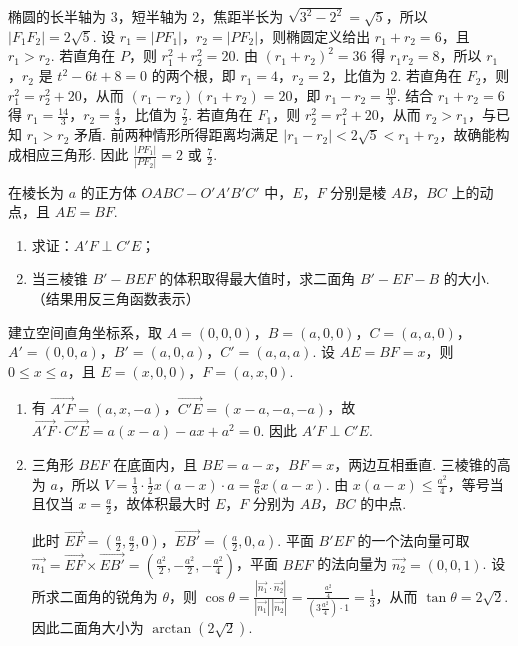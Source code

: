 \begin{solution}
椭圆的长半轴为 \(3\)，短半轴为 \(2\)，焦距半长为 \(\sqrt{3^2-2^2}=\sqrt5\)，所以 \(|F_1F_2|=2\sqrt5\). 设 \(r_1=|PF_1|\)，\(r_2=|PF_2|\)，则椭圆定义给出 \(r_1+r_2=6\)，且 \(r_1>r_2\). 若直角在 \(P\)，则 \(r_1^2+r_2^2=20\). 由 \((r_1+r_2)^2=36\) 得 \(r_1r_2=8\)，所以 \(r_1\)，\(r_2\) 是 \(t^2-6t+8=0\) 的两个根，即 \(r_1=4\)，\(r_2=2\)，比值为 \(2\). 若直角在 \(F_2\)，则 \(r_1^2=r_2^2+20\)，从而 \((r_1-r_2)(r_1+r_2)=20\)，即 \(r_1-r_2=\frac{10}{3}\). 结合 \(r_1+r_2=6\) 得 \(r_1=\frac{14}{3}\)，\(r_2=\frac43\)，比值为 \(\frac72\). 若直角在 \(F_1\)，则 \(r_2^2=r_1^2+20\)，从而 \(r_2>r_1\)，与已知 \(r_1>r_2\) 矛盾. 前两种情形所得距离均满足 \(|r_1-r_2|<2\sqrt5<r_1+r_2\)，故确能构成相应三角形. 因此 \(\frac{|PF_1|}{|PF_2|}=2\) 或 \(\frac72\).
\end{solution}

\begin{problem}
在棱长为 \(a\) 的正方体 \(OABC-O'A'B'C'\) 中，\(E\)，\(F\) 分别是棱 \(AB\)，\(BC\) 上的动点，且 \(AE=BF\).

\begin{enumerate}
\item 求证：\(A'F\perp C'E\)；
\item 当三棱锥 \(B'-BEF\) 的体积取得最大值时，求二面角 \(B'-EF-B\) 的大小. （结果用反三角函数表示）
\end{enumerate}
\end{problem}

\begin{solution}
建立空间直角坐标系，取 \(A=(0,0,0)\)，\(B=(a,0,0)\)，\(C=(a,a,0)\)，\(A'=(0,0,a)\)，\(B'=(a,0,a)\)，\(C'=(a,a,a)\). 设 \(AE=BF=x\)，则 \(0\leqslant x\leqslant a\)，且 \(E=(x,0,0)\)，\(F=(a,x,0)\).

\begin{enumerate}
\item 有 \(\overrightarrow{A'F}=(a,x,-a)\)，\(\overrightarrow{C'E}=(x-a,-a,-a)\)，故 \(\overrightarrow{A'F}\cdot\overrightarrow{C'E}=a(x-a)-ax+a^2=0\). 因此 \(A'F\perp C'E\).
\item 三角形 \(BEF\) 在底面内，且 \(BE=a-x\)，\(BF=x\)，两边互相垂直. 三棱锥的高为 \(a\)，所以 \(V=\frac13\cdot\frac12x(a-x)\cdot a=\frac a6x(a-x)\). 由 \(x(a-x)\leqslant\frac{a^2}{4}\)，等号当且仅当 \(x=\frac a2\)，故体积最大时 \(E\)，\(F\) 分别为 \(AB\)，\(BC\) 的中点.

此时 \(\overrightarrow{EF}=\left(\frac a2,\frac a2,0\right)\)，\(\overrightarrow{EB'}=\left(\frac a2,0,a\right)\). 平面 \(B'EF\) 的一个法向量可取 \(\overrightarrow{n_1}=\overrightarrow{EF}\times\overrightarrow{EB'}=\left(\frac{a^2}{2},-\frac{a^2}{2},-\frac{a^2}{4}\right)\)，平面 \(BEF\) 的法向量为 \(\overrightarrow{n_2}=(0,0,1)\). 设所求二面角的锐角为 \(\theta\)，则 \(\cos\theta=\frac{|\overrightarrow{n_1}\cdot\overrightarrow{n_2}|}{|\overrightarrow{n_1}|\,|\overrightarrow{n_2}|}=\frac{\frac{a^2}{4}}{(3\frac{a^2}{4})\cdot1}=\frac13\)，从而 \(\tan\theta=2\sqrt2\). 因此二面角大小为 \(\arctan(2\sqrt2)\).
\end{enumerate}
\end{solution}


